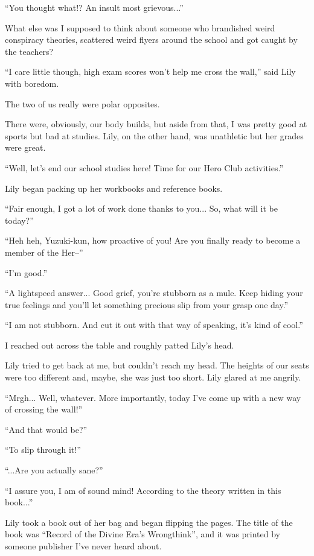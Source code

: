 ``You thought what!? An insult most grievous...''

What else was I supposed to think about someone who brandished weird conspiracy theories, scattered weird flyers around the school and got caught by the teachers?

``I care little though, high exam scores won't help me cross the wall,'' said Lily with boredom.

The two of us really were polar opposites.

There were, obviously, our body builds, but aside from that, I was pretty good at sports but bad at studies. Lily, on the other hand, was unathletic but her grades were great.

``Well, let's end our school studies here! Time for our Hero Club activities.''

Lily began packing up her workbooks and reference books.

``Fair enough, I got a lot of work done thanks to you... So, what will it be today?''

``Heh heh, Yuzuki-kun, how proactive of you! Are you finally ready to become a member of the Her--''

``I'm good.''

``A lightspeed answer... Good grief, you're stubborn as a mule. Keep hiding your true feelings and you'll let something precious slip from your grasp one day.''

``I am not stubborn. And cut it out with that way of speaking, it's kind of cool.''

I reached out across the table and roughly patted Lily's head.

Lily tried to get back at me, but couldn't reach my head. The heights of our seats were too different and, maybe, she was just too short. Lily glared at me angrily.

``Mrgh... Well, whatever. More importantly, today I've come up with a new way of crossing the wall!''

``And that would be?''

``To slip through it!''

``...Are you actually sane?''

``I assure you, I am of sound mind! According to the theory written in this book...''

Lily took a book out of her bag and began flipping the pages. The title of the book was ``Record of the Divine Era's Wrongthink'', and it was printed by someone publisher I've never heard about.


